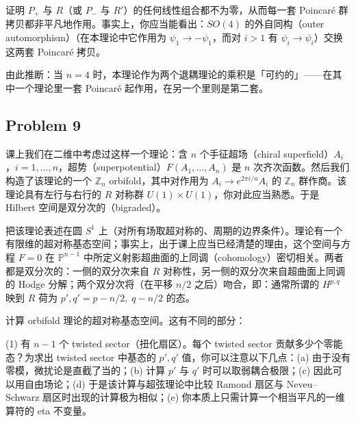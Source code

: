 证明 $P_+$ 与 $R$（或 $P_-$ 与 $R'$）的任何线性组合都不为零，从而每一套 Poincaré 群拷贝都非平凡地作用。事实上，你应当能看出：$SO(4)$ 的外自同构（outer automorphism）（在本理论中它作用为 $\psi_1\to-\psi_1$，而对 $i>1$ 有 $\psi_i\to\psi_i$）交换这两套 Poincaré 拷贝。

由此推断：当 $n=4$ 时，本理论作为两个退耦理论的乘积是「可约的」——在其中一个理论里一套 Poincaré 起作用，在另一个里则是第二套。


\subsection*{Problem 9}

课上我们在二维中考虑过这样一个理论：含 $n$ 个手征超场（chiral superfield）$A_i$，$i=1,\dots,n$，超势（superpotential）$F(A_1,\dots,A_n)$ 是 $n$ 次齐次函数。然后我们构造了该理论的一个 $\mathbb{Z}_n$ orbifold，其中对作用为 $A_i\to e^{2\pi i/n}A_i$ 的 $\mathbb{Z}_n$ 群作商。该理论具有左行与右行的 $R$ 对称群 $U(1)\times U(1)$，你对此应当熟悉。于是 Hilbert 空间是双分次的（bigraded）。

把该理论表述在圆 $S^1$ 上（对所有场取超对称的、周期的边界条件）。理论有一个有限维的超对称基态空间；事实上，出于课上应当已经清楚的理由，这个空间与方程 $F=0$ 在 $\mathbb{P}^{n-1}$ 中所定义射影超曲面的上同调（cohomology）密切相关。两者都是双分次的：一侧的双分次来自 $R$ 对称性，另一侧的双分次来自超曲面上同调的 Hodge 分解；两个双分次将（在平移 $n/2$ 之后）吻合，即：通常所谓的 $H^{p,q}$ 映到 $R$ 荷为 $p',q'=p-n/2,\;q-n/2$ 的态。

计算 orbifold 理论的超对称基态空间。这有不同的部分：

(1) 有 $n-1$ 个 twisted sector（扭化扇区）。每个 twisted sector 贡献多少个零能态？为求出 twisted sector 中基态的 $p',q'$ 值，你可以注意以下几点：(a) 由于没有零模，微扰论是直截了当的；(b) 计算 $p'$ 与 $q'$ 时可以取弱耦合极限；(c) 因此可以用自由场论；(d) 于是该计算与超弦理论中比较 Ramond 扇区与 Neveu–Schwarz 扇区时出现的计算极为相似；(e) 你本质上只需计算一个相当平凡的一维算符的 eta 不变量。


